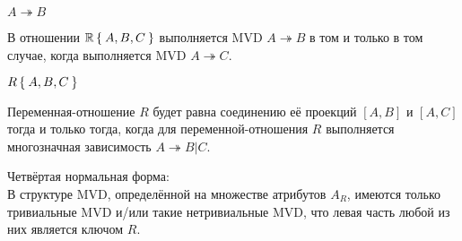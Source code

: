 \begin{notation}
	$ A \twoheadrightarrow B $
\end{notation}

\begin{lemma}[Фейджина]
	В отношении $ \mathbb{R} \Set{A, B, C} $ выполняется MVD $ A \twoheadrightarrow B $ в том и только в том случае, когда выполняется MVD $ A \twoheadrightarrow C $.
\end{lemma}

\begin{theorem}[Фейджина]
	$ R \Set{A, B, C} $

	Переменная-отношение $ R $ будет равна соединению её проекций $ [A, B] $ и $ [A, C] $ тогда и только тогда, когда для переменной-отношения $ R $ выполняется многозначная зависимость $ A \twoheadrightarrow B | C $.
\end{theorem}

Четвёртая нормальная форма: \\
В структуре MVD, определённой на множестве атрибутов $ A_R $, имеются только тривиальные MVD и/или такие нетривиальные MVD, что левая часть любой из них является ключом $ R $.
